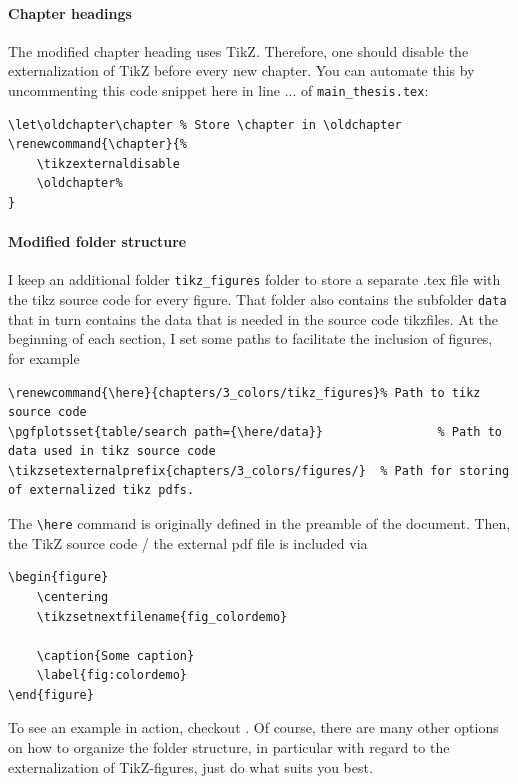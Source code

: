 \paragraph{Chapter headings} The modified chapter heading uses TikZ. Therefore, one should disable the externalization of TikZ before every new chapter. You can automate this by uncommenting this code snippet here in line ... of \verb|main_thesis.tex|:
\begin{lstlisting}
\let\oldchapter\chapter	% Store \chapter in \oldchapter
\renewcommand{\chapter}{%
	\tikzexternaldisable
	\oldchapter%
}
\end{lstlisting}
\paragraph{Modified folder structure}
I keep an additional folder \verb|tikz_figures| folder to store a separate .tex file with the tikz source code for every figure. That folder also contains the subfolder \verb|data| that in turn contains the data that is needed in the source code tikzfiles. At the beginning of each section, I set some paths to facilitate the inclusion of figures, for example
\begin{lstlisting}
\renewcommand{\here}{chapters/3_colors/tikz_figures}% Path to tikz source code
\pgfplotsset{table/search path={\here/data}}				% Path to data used in tikz source code
\tikzsetexternalprefix{chapters/3_colors/figures/}	% Path for storing of externalized tikz pdfs.
\end{lstlisting}
The \verb|\here| command is originally defined in the preamble of the document.
Then, the TikZ source code / the external pdf file is included via
\begin{lstlisting}
\begin{figure}
	\centering
	\tikzsetnextfilename{fig_colordemo}
	
	\caption{Some caption}
	\label{fig:colordemo}
\end{figure}
\end{lstlisting}
To see an example in action, checkout .
Of course, there are many other options on how to organize the folder structure, in particular with regard to the externalization of TikZ-figures, just do what suits you best.

